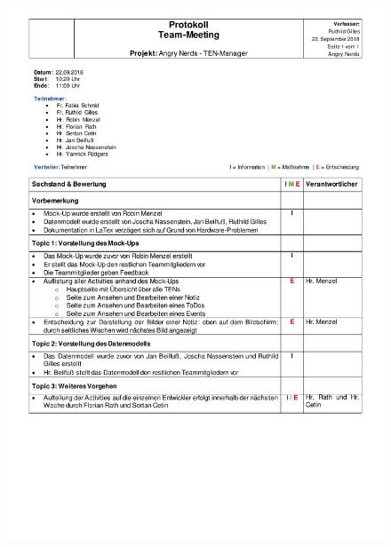 \begin{figure}[H]
\centering
\begin{minipage}[t]{1\textwidth} %
\includegraphics[width=1\textwidth]{img/Protokoll2018-09-22.pdf}\\ %
\end{minipage}
\end{figure}

